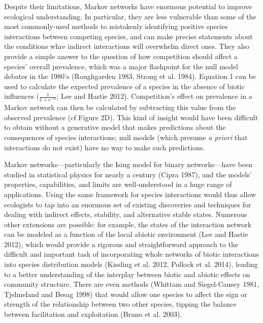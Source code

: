 \documentclass[12pt,]{article}
\begin{document}
\begin{spacing}{1.9}
\begin{flushleft}
Despite their limitations, Markov networks have enormous potential to
improve ecological understanding. In particular, they are less
vulnerable than some of the most commonly-used methods to mistakenly
identifying positive species interactions between competing species, and
can make precise statements about the conditions whre indirect
interactions will overwhelm direct ones. They also provide a simple
answer to the question of how competition should affect a species'
overall prevalence, which was a major flashpoint for the null model
debates in the 1980's (Roughgarden 1983, Strong et al. 1984). Equation 1
can be used to calculate the expected prevalence of a species in the
absence of biotic influences (\(\frac{1}{1 + e^{-\alpha}}\); Lee and
Hastie 2012). Competition's effect on prevalence in a Markov network can
then be calculated by subtracting this value from the observed
prevalence (cf Figure 2D). This kind of insight would have been
difficult to obtain without a generative model that makes predictions
about the consequences of species interactions; null models (which
presume \emph{a priori} that interactions do not exist) have no way to
make such predictions.

Markov networks---particularly the Ising model for binary
networks---have been studied in statistical physics for nearly a century
(Cipra 1987), and the models' properties, capabilities, and limits are
well-understood in a huge range of applications. Using the same
framework for species interactions would thus allow ecologists to tap
into an enormous set of existing discoveries and techniques for dealing
with indirect effects, stability, and alternative stable states.
Numerous other extensions are possible: for example, the states of the
interaction network can be modeled as a function of the local abiotic
environment (Lee and Hastie 2012), which would provide a rigorous and
straightforward approach to the difficult and important task of
incorporating whole networks of biotic interactions into species
distribution models (Kissling et al. 2012, Pollock et al. 2014), leading
to a better understanding of the interplay between biotic and abiotic
effects on community structure. There are even methods (Whittam and
Siegel-Causey 1981, Tjelmeland and Besag 1998) that would allow one
species to affect the sign or strength of the relationship between two
other species, tipping the balance between facilitation and exploitation
(Bruno et al. 2003).


\end{flushleft}
\end{spacing}
\end{document}
